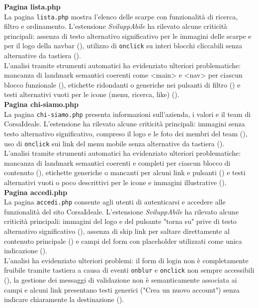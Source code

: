 \noindent \textbf{Pagina lista.php}\\
La pagina \texttt{lista.php} mostra l’elenco delle scarpe con funzionalità di ricerca, filtro e ordinamento. 
L’estensione \textit{SviluppAbile} ha rilevato alcune criticità principali: assenza di testo alternativo significativo per le immagini delle scarpe e per il logo della navbar ({}), utilizzo di \texttt{onclick} su interi blocchi cliccabili senza alternative da tastiera ({}).\\
L’analisi tramite strumenti automatici ha evidenziato ulteriori problematiche: mancanza di landmark semantici coerenti come <main> e <nav> per ciascun blocco funzionale ({}), etichette ridondanti o generiche nei pulsanti di filtro ({}) e testi alternativi vuoti per le icone (menu, ricerca, like) ({}).\\

\noindent \textbf{Pagina chi-siamo.php}\\
La pagina \texttt{chi-siamo.php} presenta informazioni sull’azienda, i valori e il team di CorsaIdeale. 
L’estensione ha rilevato alcune criticità principali: immagini senza testo alternativo significativo, compreso il logo e le foto dei membri del team ({}), uso di \texttt{onclick} sui link del menu mobile senza alternative da tastiera ({}).\\
L’analisi tramite strumenti automatici ha evidenziato ulteriori problematiche: mancanza di landmark semantici coerenti e completi per ciascun blocco di contenuto ({}), etichette generiche o mancanti per alcuni link e pulsanti ({}) e testi alternativi vuoti o poco descrittivi per le icone e immagini illustrative ({}).\\

\noindent \textbf{Pagina accedi.php}\\
La pagina \texttt{accedi.php} consente agli utenti di autenticarsi e accedere alle funzionalità del sito CorsaIdeale. 
L’estensione \textit{SviluppAbile} ha rilevato alcune criticità principali: immagini del logo e del pulsante "torna su" prive di testo alternativo significativo ({}), assenza di skip link per saltare direttamente al contenuto principale ({}) e campi del form con placeholder utilizzati come unica indicazione ({}).\\
L’analisi ha evidenziato ulteriori problemi: il form di login non è completamente fruibile tramite tastiera a causa di eventi \texttt{onblur} e \texttt{onclick} non sempre accessibili ({}), la gestione dei messaggi di validazione non è semanticamente associata ai campi e alcuni link presentano testi generici ("Crea un nuovo account") senza indicare chiaramente la destinazione ({}).\\

